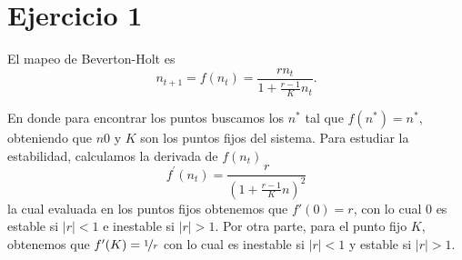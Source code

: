 \section*{Ejercicio 1}
\graphicspath{{Figuras/ej_01/}}


El mapeo de Beverton-Holt es
\begin{equation}
    n_{t+1} = f(n_{t}) = \frac{rn_{t}}{1+\frac{r-1}{K}n_{t}}.
\end{equation}

En donde para encontrar los puntos buscamos los $n^{*}$ tal que $f(n^{*}) = n^{*}$, obteniendo que $n0$ y $K$ son los puntos fijos del sistema. Para estudiar la estabilidad, calculamos la derivada de $f(n_{t})$
\begin{equation}
    f^{'}(n_{t}) = \frac{r}{(1+\frac{r-1}{K}n)^{2}}
    \label{eq:Mapeo_Beverton-Holt}
\end{equation}
la cual evaluada en los puntos fijos obtenemos que $f'(0) = r$, con lo cual $0$ es estable si $|r|<1$ e inestable si $|r|>1$. Por otra parte, para el punto fijo $K$, obtenemos que $f'(K)=\nicefrac{1}{r}$ con lo cual es inestable si $|r|<1$ y estable si $|r|>1$.

